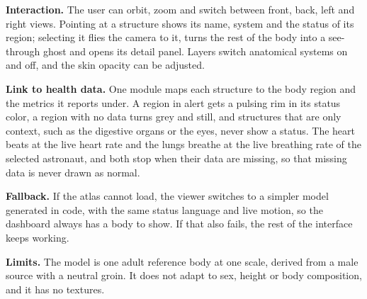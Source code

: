 
\medskip\noindent\textbf{Interaction.} The user can orbit, zoom and switch between front, back, left and right views. Pointing at a structure shows its name, system and the status of its region; selecting it flies the camera to it, turns the rest of the body into a see-through ghost and opens its detail panel. Layers switch anatomical systems on and off, and the skin opacity can be adjusted.

\medskip\noindent\textbf{Link to health data.} One module maps each structure to the body region and the metrics it reports under. A region in alert gets a pulsing rim in its status color, a region with no data turns grey and still, and structures that are only context, such as the digestive organs or the eyes, never show a status. The heart beats at the live heart rate and the lungs breathe at the live breathing rate of the selected astronaut, and both stop when their data are missing, so that missing data is never drawn as normal.


\medskip\noindent\textbf{Fallback.} If the atlas cannot load, the viewer switches to a simpler model generated in code, with the same status language and live motion, so the dashboard always has a body to show. If that also fails, the rest of the interface keeps working.

\medskip\noindent\textbf{Limits.} The model is one adult reference body at one scale, derived from a male source with a neutral groin. It does not adapt to sex, height or body composition, and it has no textures.


